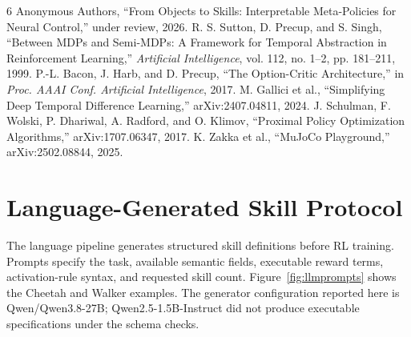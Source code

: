 \documentclass[conference,letterpaper,10pt]{IEEEtran}
\begin{document}
\begin{thebibliography}{6}
 Anonymous Authors, ``From Objects to Skills: Interpretable Meta-Policies for Neural Control,'' under review, 2026.
 R. S. Sutton, D. Precup, and S. Singh, ``Between MDPs and Semi-MDPs: A Framework for Temporal Abstraction in Reinforcement Learning,'' \emph{Artificial Intelligence}, vol. 112, no. 1--2, pp. 181--211, 1999.
 P.-L. Bacon, J. Harb, and D. Precup, ``The Option-Critic Architecture,'' in \emph{Proc. AAAI Conf. Artificial Intelligence}, 2017.
 M. Gallici et al., ``Simplifying Deep Temporal Difference Learning,'' arXiv:2407.04811, 2024.
 J. Schulman, F. Wolski, P. Dhariwal, A. Radford, and O. Klimov, ``Proximal Policy Optimization Algorithms,'' arXiv:1707.06347, 2017.
 K. Zakka et al., ``MuJoCo Playground,'' arXiv:2502.08844, 2025.
\end{thebibliography}


\clearpage
\appendices

\section{Language-Generated Skill Protocol}
\label{app:llm}

The language pipeline generates structured skill definitions before RL training. Prompts specify the task, available semantic fields, executable reward terms, activation-rule syntax, and requested skill count. Figure~\ref{fig:llmprompts} shows the Cheetah and Walker examples. The generator configuration reported here is Qwen/Qwen3.8-27B; Qwen2.5-1.5B-Instruct did not produce executable specifications under the schema checks.
\end{document}
